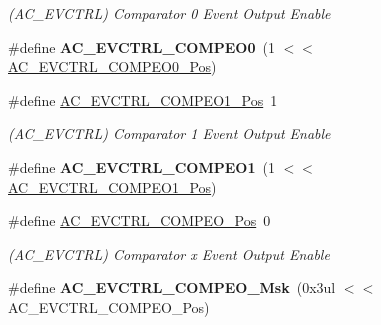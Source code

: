 \begin{DoxyCompactItemize}
\begin{DoxyCompactList}\small\item\em (A\+C\+\_\+\+E\+V\+C\+T\+R\+L) Comparator 0 Event Output Enable \end{DoxyCompactList}\item 
\hypertarget{group___s_a_m_l21___a_c_ga443162f47e422d7b23d30f50e9aea4f9}{}\#define {\bfseries A\+C\+\_\+\+E\+V\+C\+T\+R\+L\+\_\+\+C\+O\+M\+P\+E\+O0}~(1 $<$$<$ \hyperlink{group___s_a_m_l21___a_c_gaa70b302d7f87b0f6d8ab915ca5b7bf8f}{A\+C\+\_\+\+E\+V\+C\+T\+R\+L\+\_\+\+C\+O\+M\+P\+E\+O0\+\_\+\+Pos})\label{group___s_a_m_l21___a_c_ga443162f47e422d7b23d30f50e9aea4f9}

\item 
\hypertarget{group___s_a_m_l21___a_c_ga2a8ed3ce927004e2e47d23ece31c48be}{}\#define \hyperlink{group___s_a_m_l21___a_c_ga2a8ed3ce927004e2e47d23ece31c48be}{A\+C\+\_\+\+E\+V\+C\+T\+R\+L\+\_\+\+C\+O\+M\+P\+E\+O1\+\_\+\+Pos}~1\label{group___s_a_m_l21___a_c_ga2a8ed3ce927004e2e47d23ece31c48be}

\begin{DoxyCompactList}\small\item\em (A\+C\+\_\+\+E\+V\+C\+T\+R\+L) Comparator 1 Event Output Enable \end{DoxyCompactList}\item 
\hypertarget{group___s_a_m_l21___a_c_ga5cf87217a788d7a9dc14292b95754e6b}{}\#define {\bfseries A\+C\+\_\+\+E\+V\+C\+T\+R\+L\+\_\+\+C\+O\+M\+P\+E\+O1}~(1 $<$$<$ \hyperlink{group___s_a_m_l21___a_c_ga2a8ed3ce927004e2e47d23ece31c48be}{A\+C\+\_\+\+E\+V\+C\+T\+R\+L\+\_\+\+C\+O\+M\+P\+E\+O1\+\_\+\+Pos})\label{group___s_a_m_l21___a_c_ga5cf87217a788d7a9dc14292b95754e6b}

\item 
\hypertarget{group___s_a_m_l21___a_c_ga9a60df9204a6150ee4ce9fc489666d9d}{}\#define \hyperlink{group___s_a_m_l21___a_c_ga9a60df9204a6150ee4ce9fc489666d9d}{A\+C\+\_\+\+E\+V\+C\+T\+R\+L\+\_\+\+C\+O\+M\+P\+E\+O\+\_\+\+Pos}~0\label{group___s_a_m_l21___a_c_ga9a60df9204a6150ee4ce9fc489666d9d}

\begin{DoxyCompactList}\small\item\em (A\+C\+\_\+\+E\+V\+C\+T\+R\+L) Comparator x Event Output Enable \end{DoxyCompactList}\item 
\hypertarget{group___s_a_m_l21___a_c_gaa2bc0028969cfae7d019b84e77c42bc8}{}\#define {\bfseries A\+C\+\_\+\+E\+V\+C\+T\+R\+L\+\_\+\+C\+O\+M\+P\+E\+O\+\_\+\+Msk}~(0x3ul $<$$<$ A\+C\+\_\+\+E\+V\+C\+T\+R\+L\+\_\+\+C\+O\+M\+P\+E\+O\+\_\+\+Pos)\label{group___s_a_m_l21___a_c_gaa2bc0028969cfae7d019b84e77c42bc8}


\end{DoxyCompactItemize}
